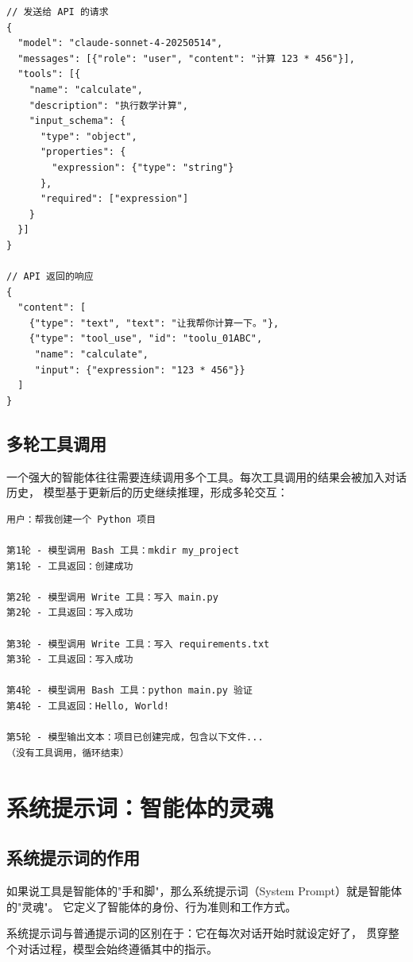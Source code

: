 \begin{verbatim}
// 发送给 API 的请求
{
  "model": "claude-sonnet-4-20250514",
  "messages": [{"role": "user", "content": "计算 123 * 456"}],
  "tools": [{
    "name": "calculate",
    "description": "执行数学计算",
    "input_schema": {
      "type": "object",
      "properties": {
        "expression": {"type": "string"}
      },
      "required": ["expression"]
    }
  }]
}

// API 返回的响应
{
  "content": [
    {"type": "text", "text": "让我帮你计算一下。"},
    {"type": "tool_use", "id": "toolu_01ABC",
     "name": "calculate",
     "input": {"expression": "123 * 456"}}
  ]
}
\end{verbatim}

\subsection{多轮工具调用}

一个强大的智能体往往需要连续调用多个工具。每次工具调用的结果会被加入对话历史，
模型基于更新后的历史继续推理，形成多轮交互：

\begin{verbatim}
用户：帮我创建一个 Python 项目

第1轮 - 模型调用 Bash 工具：mkdir my_project
第1轮 - 工具返回：创建成功

第2轮 - 模型调用 Write 工具：写入 main.py
第2轮 - 工具返回：写入成功

第3轮 - 模型调用 Write 工具：写入 requirements.txt
第3轮 - 工具返回：写入成功

第4轮 - 模型调用 Bash 工具：python main.py 验证
第4轮 - 工具返回：Hello, World!

第5轮 - 模型输出文本：项目已创建完成，包含以下文件...
（没有工具调用，循环结束）
\end{verbatim}

\section{系统提示词：智能体的灵魂}

\subsection{系统提示词的作用}

如果说工具是智能体的"手和脚"，那么系统提示词（System Prompt）就是智能体的"灵魂"。
它定义了智能体的身份、行为准则和工作方式。

系统提示词与普通提示词的区别在于：它在每次对话开始时就设定好了，
贯穿整个对话过程，模型会始终遵循其中的指示。


